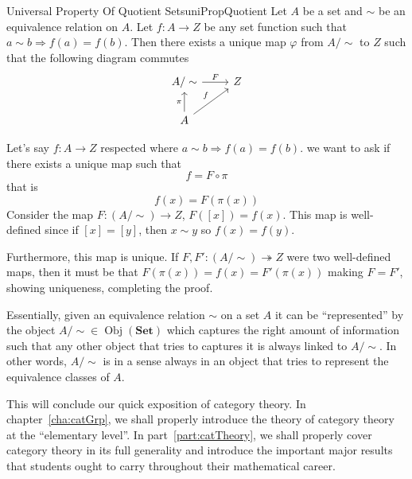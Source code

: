 \documentclass{book}
\newcommand{\Obj}{{\operatorname{Obj}}}
\newcommand{\rw}{\rightarrow}
\newcommand{\Rw}{\Rightarrow}
\renewcommand{\bf}[1]{\textbf{#1}}
\let\temp\phi
\let\phi\varphi
\let\varphi\temp
\begin{document}
\begin{thm}{Universal Property Of Quotient Sets}{uniPropQuotient}
	Let $A$ be a set and $\sim$ be an equivalence relation on $A$. Let $f: A \rw Z$ be any set function such that $a\sim
	b \Rw f(a) = f(b)$. Then there exists a unique map $\phi$ from $A/\sim$ to $Z$ such that the following diagram commutes
	\[
		\begin{tikzcd}
		A/\sim \arrow[r, "F"]             & Z \\
		A \arrow[u, "\pi"] \arrow[ru, "f"] &
		\end{tikzcd}
	\]
\end{thm}

\begin{Proof}
	Let's say $f: A \rw Z$ respected where $a\sim b \Rw f(a) = f(b)$. we want to ask if there exists a unique map such that
	\[
		f = F\circ \pi
	\]
	that is
	\[
		f(x) = F(\pi(x))
	\]
	Consider the map $F: (A/\sim) \rw Z$, $F([x]) = f(x)$. This map is well-defined since if $[x] = [y]$, then $x \sim y$
	so $f(x) = f(y)$.

	Furthermore, this map is unique. If $F, F': (A/\sim) \twoheadrightarrow Z$ were two well-defined
	maps, then it must be that $F(\pi(x)) = f(x) = F'(\pi(x))$ making $F = F'$, showing uniqueness, completing the
	proof.
\end{Proof}

Essentially, given an equivalence relation $\sim$ on a set $A$ it can be ``represented'' by the object $A/\sim
\in \Obj(\bf{Set})$ which captures the right amount of information such that any other object that tries to
captures it is always linked to $A/\sim$. In other words, $A/\sim$ is in a sense always in an object that
tries to represent the equivalence classes of $A$.

This will conclude our quick exposition of category theory. In chapter~\ref{cha:catGrp}, we shall properly
introduce the theory of category theory at the ``elementary level''. In part~\ref{part:catTheory}, we shall
properly cover category theory in its full generality and introduce the important major results that students
ought to carry throughout their mathematical career.
\end{document}

